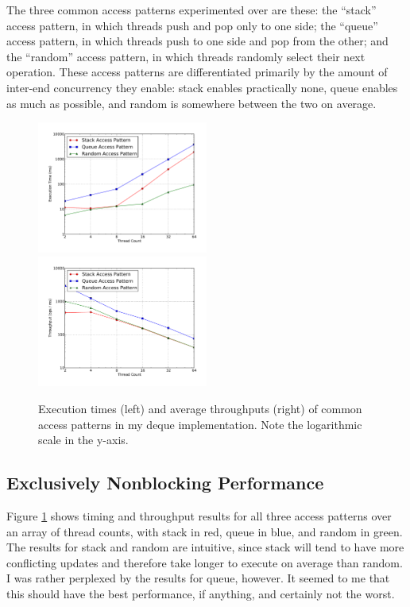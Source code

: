 \documentclass[11pt, letterpaper]{article}
\begin{document}
        The three common access patterns experimented over are these: the ``stack'' access pattern, in which threads push and pop only to one side; the ``queue'' access pattern, in which threads push to one side and pop from the other; and the ``random'' access pattern, in which threads randomly select their next operation. These access patterns are differentiated primarily by the amount of inter-end concurrency they enable: stack enables practically none, queue enables as much as possible, and random is somewhere between the two on average.

        \begin{figure}[t!]
            \includegraphics[width=0.5\textwidth]{unbounded/exp/plot/access_timing.pdf}
            \includegraphics[width=0.5\textwidth]{unbounded/exp/plot/access_throughput.pdf}
            \caption{Execution times (left) and average throughputs (right) of common access patterns in my deque implementation. Note the logarithmic scale in the y-axis.}
            \label{figure::access-plot}
        \end{figure}

        \subsection{Exclusively Nonblocking Performance}
            Figure \ref{figure::access-plot} shows timing and throughput results for all three access patterns over an array of thread counts, with stack in red, queue in blue, and random in green. The results for stack and random are intuitive, since stack will tend to have more conflicting updates and therefore take longer to execute on average than random. I was rather perplexed by the results for queue, however. It seemed to me that this should have the best performance, if anything, and certainly not the worst.
\end{document}
